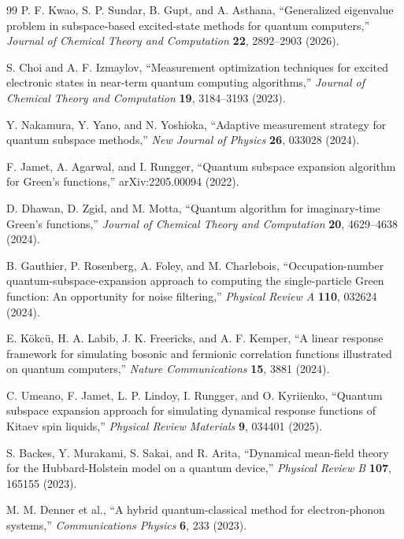 \documentclass[
  reprint,
  amsmath,
  amssymb,
  aps,
  pra,
  nofootinbib,
  superscriptaddress,
  floatfix
]{revtex4-2}
\begin{document}
\begin{thebibliography}{99}
P. F. Kwao, S. P. Sundar, B. Gupt, and A. Asthana,
``Generalized eigenvalue problem in subspace-based excited-state methods for quantum computers,''
\emph{Journal of Chemical Theory and Computation} \textbf{22}, 2892--2903 (2026).

S. Choi and A. F. Izmaylov,
``Measurement optimization techniques for excited electronic states in near-term quantum computing algorithms,''
\emph{Journal of Chemical Theory and Computation} \textbf{19}, 3184--3193 (2023).

Y. Nakamura, Y. Yano, and N. Yoshioka,
``Adaptive measurement strategy for quantum subspace methods,''
\emph{New Journal of Physics} \textbf{26}, 033028 (2024).

F. Jamet, A. Agarwal, and I. Rungger,
``Quantum subspace expansion algorithm for Green's functions,''
arXiv:2205.00094 (2022).

D. Dhawan, D. Zgid, and M. Motta,
``Quantum algorithm for imaginary-time Green's functions,''
\emph{Journal of Chemical Theory and Computation} \textbf{20}, 4629--4638 (2024).

B. Gauthier, P. Rosenberg, A. Foley, and M. Charlebois,
``Occupation-number quantum-subspace-expansion approach to computing the single-particle Green function: An opportunity for noise filtering,''
\emph{Physical Review A} \textbf{110}, 032624 (2024).

E. K\"okc\"u, H. A. Labib, J. K. Freericks, and A. F. Kemper,
``A linear response framework for simulating bosonic and fermionic correlation functions illustrated on quantum computers,''
\emph{Nature Communications} \textbf{15}, 3881 (2024).

C. Umeano, F. Jamet, L. P. Lindoy, I. Rungger, and O. Kyriienko,
``Quantum subspace expansion approach for simulating dynamical response functions of Kitaev spin liquids,''
\emph{Physical Review Materials} \textbf{9}, 034401 (2025).

S. Backes, Y. Murakami, S. Sakai, and R. Arita,
``Dynamical mean-field theory for the Hubbard-Holstein model on a quantum device,''
\emph{Physical Review B} \textbf{107}, 165155 (2023).

M. M. Denner et al.,
``A hybrid quantum-classical method for electron-phonon systems,''
\emph{Communications Physics} \textbf{6}, 233 (2023).


\end{thebibliography}
\end{document}
